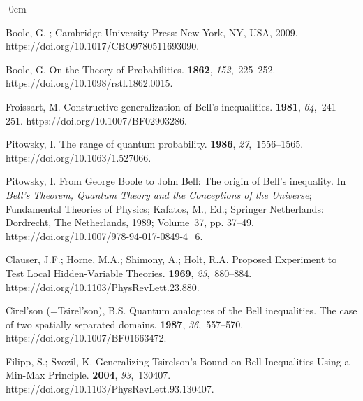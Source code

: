 \documentclass[entropy,article,accept,oneauthor,pdftex]{Definitions/mdpi}
\begin{document}
\begin{adjustwidth}{-\extralength}{0cm}
\begin{thebibliography}{999}


Boole, G.
;
  Cambridge University Press: New York, NY, USA,
  2009.
\newblock
  {https://doi.org/10.1017/CBO9780511693090}.

Boole, G.
\newblock On the Theory of Probabilities.
 {\bf
  1862}, {\em 152},~225--252.
\newblock
  {https://doi.org/10.1098/rstl.1862.0015}.

Froissart, M.
\newblock Constructive generalization of {B}ell's inequalities.
 {\bf 1981}, {\em
  64},~241--251.
\newblock
  {https://doi.org/10.1007/BF02903286}.

Pitowsky, I.
\newblock The range of quantum probability.
 {\bf 1986}, {\em
  27},~1556--1565.
\newblock
  {https://doi.org/10.1063/1.527066}.

Pitowsky, I.
\newblock From {G}eorge {B}oole to {J}ohn {B}ell: The origin of {B}ell's
  inequality. In {\em {B}ell's Theorem, Quantum Theory and the Conceptions of
  the Universe}; {Fundamental Theories of
  Physics}; Kafatos, M., Ed.; Springer Netherlands:
 Dordrecht, The Netherlands, 1989; Volume~37, pp. 37--49.
\newblock
  {https://doi.org/10.1007/978-94-017-0849-4\_6}.

Clauser, J.F.; Horne, M.A.; Shimony, A.; Holt, R.A.
\newblock Proposed Experiment to Test Local Hidden-Variable Theories.
 {\bf 1969}, {\em 23},~880--884.
\newblock
  {https://doi.org/10.1103/PhysRevLett.23.880}.

{Cirel'son (=Tsirel'son)}, B.S.
\newblock Quantum analogues of the {B}ell inequalities. {T}he case of two
  spatially separated domains.
 {\bf 1987}, {\em 36},~557--570.
\newblock
  {https://doi.org/10.1007/BF01663472}.

Filipp, S.; Svozil, K.
\newblock Generalizing {T}sirelson's Bound on {B}ell Inequalities Using a
  Min-Max Principle.
 {\bf 2004}, {\em 93},~130407.
\newblock
  {https://doi.org/10.1103/PhysRevLett.93.130407}.


\end{thebibliography}
\end{adjustwidth}
\end{document}
